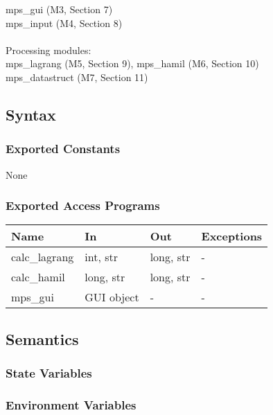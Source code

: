\documentclass[12pt, titlepage]{article}
\begin{document}
mps\_gui (M3, Section 7)\\
mps\_input (M4, Section 8)\\\\
Processing modules:\\
mps\_lagrang (M5, Section 9), mps\_hamil (M6, Section 10)\\
mps\_datastruct (M7, Section 11)\\

\subsection{Syntax}

\subsubsection{Exported Constants}

None

\subsubsection{Exported Access Programs}

\begin{center}
\begin{tabular}{p{2cm} p{4cm} p{4cm} p{2cm}}
\hline
\textbf{Name} & \textbf{In} & \textbf{Out} & \textbf{Exceptions} \\
\hline
calc\_lagrang & int, str & long, str & - \\
calc\_hamil & long, str & long, str & - \\
mps\_gui & GUI object & - & - \\
\hline
\end{tabular}
\end{center}

\subsection{Semantics}

\subsubsection{State Variables}


\subsubsection{Environment Variables}
\end{document}
